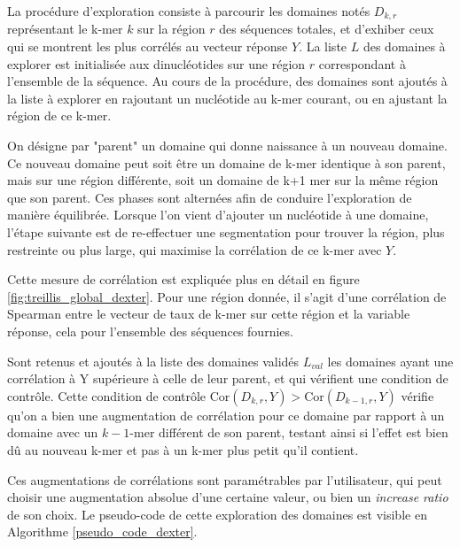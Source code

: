 \documentclass[french]{llncs}
\begin{document}
La procédure d'exploration consiste à parcourir les domaines notés $D_{k,r}$ représentant le k-mer $k$ sur la région $r$ des séquences totales, et d'exhiber ceux qui se montrent les plus corrélés au vecteur réponse $Y$. La liste $L$ des domaines à explorer est initialisée aux dinucléotides sur une région $r$ correspondant à l'ensemble de la séquence. Au cours de la procédure, des domaines sont ajoutés à la liste à explorer en rajoutant un nucléotide au k-mer courant, ou en ajustant la région de ce k-mer. 

On désigne par "parent" un domaine qui donne naissance à un nouveau domaine. Ce nouveau domaine peut soit être un domaine de k-mer identique à son parent, mais sur une région différente, soit un domaine de k+1 mer sur la même région que son parent. Ces phases sont alternées afin de conduire l'exploration de manière équilibrée. Lorsque l'on vient d'ajouter un nucléotide à une domaine, l'étape suivante est de re-effectuer une segmentation pour trouver la région, plus restreinte ou plus large, qui maximise la corrélation de ce k-mer avec $Y$. 

Cette mesure de corrélation est expliquée plus en détail en figure \ref{fig:treillis_global_dexter}. Pour une région donnée, il s'agit d'une corrélation de Spearman entre le vecteur de taux de k-mer sur cette région et la variable réponse, cela pour l'ensemble des séquences fournies. 

Sont retenus et ajoutés à la liste des domaines validés $L_{val}$ les domaines ayant une corrélation à Y supérieure à celle de leur parent, et qui vérifient une condition de contrôle.  Cette condition de contrôle $\mathrm{Cor}(D_{k,r}, Y) > \mathrm{Cor}(D_{k-1,r}, Y) $ vérifie qu'on a bien une augmentation de corrélation pour ce domaine par rapport à un domaine avec un $k-1$-mer différent de son parent, testant ainsi si l'effet est bien dû au nouveau k-mer et pas à un k-mer plus petit qu'il contient. 

Ces augmentations de corrélations sont paramétrables par l'utilisateur, qui peut choisir une augmentation absolue d'une certaine valeur, ou bien un \textit{increase ratio} de son choix. 
Le pseudo-code de cette exploration des domaines est visible en Algorithme \ref{pseudo_code_dexter}.
\end{document}
